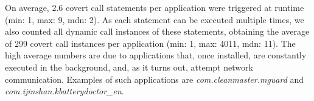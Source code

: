 On average, 2.6 covert call statements per application were triggered at runtime  (min: 1, max: 9, mdn: 2). 
As each statement can be executed multiple times, we also counted all dynamic call instances of these statements, obtaining the average of 
299 covert call instances per application (min: 1, max: 4011, mdn: 11). 
The high average numbers are due to applications that, once installed, are constantly executed in the background,
and, as it turns out, attempt network communication. Examples of such applications are  \emph{com.cleanmaster.mguard} and \emph{com.ijinshan.kbatterydoctor\_en}.

 



